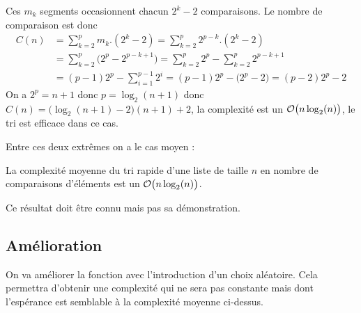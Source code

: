 Ces $m_k$ segments occasionnent chacun $2^k-2$ comparaisons. Le nombre de comparaison est donc 
\begin{align*}
    C(n) 
    &= \sum_{k=2}^p m_k.(2^k-2) = \sum_{k=2}^p 2^{p-k}.(2^k-2) \\
    &= \sum_{k=2}^p \bigl(2^p - 2^{p-k+1}\bigr)
     = \sum_{k=2}^p 2^p - \sum_{k=2}^p 2^{p-k+1}\\
    &= (p-1)2^p - \sum_{i = 1}^{p-1} 2^i
     = (p-1)2^p - \bigl(2^p - 2)
     = (p-2)2^p - 2
\end{align*}
On a $2^p = n+1$ donc $p=\log_2(n+1)$ donc $C(n) = \bigl(\log_2(n+1) -2\bigr)(n+1) + 2$, la complexité est un ${\cal O}\bigl(n\log_2(n)\bigr)$, le tri est efficace dans ce cas.

\medskip

Entre ces deux extrêmes on a le cas moyen : 
\begin{thm} 
La complexité moyenne du tri rapide d'une liste de taille $n$ en nombre de comparaisons d'éléments est un ${\cal O}\bigl(n\log_2(n)\bigr)$.
\end{thm}
Ce résultat doit être connu mais pas sa démonstration.
\subsection{Amélioration}
On va améliorer la fonction  avec l'introduction d'un choix aléatoire. Cela permettra d'obtenir une complexité qui ne sera pas constante mais dont l'espérance est semblable à la complexité moyenne ci-dessus.

